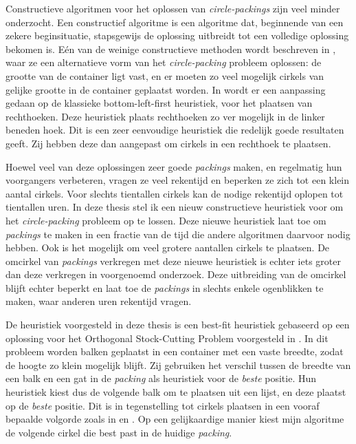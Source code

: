 \documentclass[12pt,a4paper,oneside]{book}
\begin{document}
Constructieve algoritmen voor het oplossen van \textit{circle-packings} zijn veel minder onderzocht.
Een constructief algoritme is een algoritme dat, beginnende van een zekere beginsituatie, stapsgewijs de oplossing uitbreidt tot een volledige oplossing bekomen is.
Eén van de weinige constructieve methoden wordt beschreven in \cite{akeb2006basic}, waar ze een alternatieve vorm van het \textit{circle-packing} probleem oplossen: de grootte van de container ligt vast, en er moeten zo veel mogelijk cirkels van gelijke grootte in de container geplaatst worden.
In \cite{hifi2004approximate} wordt er een aanpassing gedaan op de klassieke bottom-left-first heuristiek, voor het plaatsen van rechthoeken.
Deze heuristiek plaats rechthoeken zo ver mogelijk in de linker beneden hoek.
Dit is een zeer eenvoudige heuristiek die redelijk goede resultaten geeft.
Zij hebben deze dan aangepast om cirkels in een rechthoek te plaatsen.

Hoewel veel van deze oplossingen zeer goede \textit{packings} maken, en regelmatig hun voorgangers verbeteren, vragen ze veel rekentijd en beperken ze zich tot een klein aantal cirkels.
Voor slechts tientallen cirkels kan de nodige rekentijd oplopen tot tientallen uren.
In deze thesis stel ik een nieuw constructieve heuristiek voor om het \textit{circle-packing} probleem op te lossen.
Deze nieuwe heuristiek laat toe om \textit{packings} te maken in een fractie van de tijd die andere algoritmen daarvoor nodig hebben.
Ook is het mogelijk om veel grotere aantallen cirkels te plaatsen.
De omcirkel van \textit{packings} verkregen met deze nieuwe heuristiek is echter iets groter dan deze verkregen in voorgenoemd onderzoek.
Deze uitbreiding van de omcirkel blijft echter beperkt en laat toe de \textit{packings} in slechts enkele ogenblikken te maken, waar anderen uren rekentijd vragen.

De heuristiek voorgesteld in deze thesis is een best-fit heuristiek gebaseerd op een oplossing voor het Orthogonal Stock-Cutting Problem voorgesteld in \cite{burke2004new}.
In dit probleem worden balken geplaatst in een container met een vaste breedte, zodat de hoogte zo klein mogelijk blijft.
Zij gebruiken het verschil tussen de breedte van een balk en een gat in de \textit{packing} als heuristiek voor de \textit{beste} positie.
Hun heuristiek kiest dus de volgende balk om te plaatsen uit een lijst, en deze plaatst op de \textit{beste} positie.
Dit is in tegenstelling tot cirkels plaatsen in een vooraf bepaalde volgorde zoals in \cite{grosso2010} en \cite{jors2011}.
Op een gelijkaardige manier kiest mijn algoritme de volgende cirkel die best past in de huidige \textit{packing}.
\end{document}
